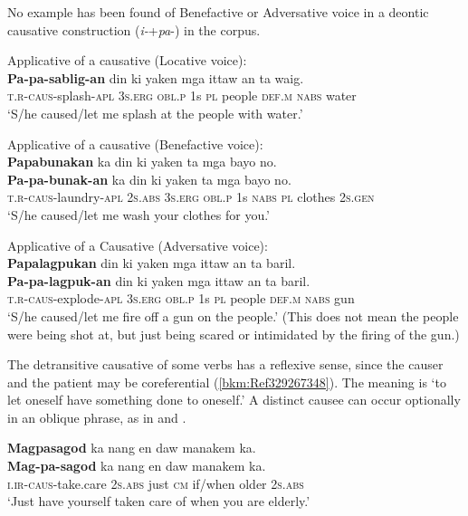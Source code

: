 No example has been found of Benefactive or Adversative voice in a deontic causative construction (\textit{i-}+\textit{pa}{}-) in the corpus.

\ea
Applicative of a causative (Locative voice): \\\smallskip
\gll \textbf{Pa-pa-sablig-an}  din  ki  yaken  mga  ittaw  an  ta  waig. \\
\textsc{t.r}-\textsc{caus}-splash-\textsc{apl}  3\textsc{s.erg}  \textsc{obl.p}  1s  \textsc{pl}  people  \textsc{def.m}  \textsc{nabs}  water \\
\glt ‘S/he caused/let me splash at the people with water.’
\z

\ea
Applicative of a causative (Benefactive voice): \\
\textbf{Papabunakan}  ka  din  ki  yaken  ta  mga  bayo  no. \\\smallskip
\gll \textbf{Pa-pa-bunak-an}  ka  din  ki  yaken  ta  mga  bayo  no. \\
\textsc{t.r}-\textsc{caus}-laundry-\textsc{apl}  2\textsc{s.abs}  3\textsc{s.erg}  \textsc{obl.p}  1s  \textsc{nabs}  \textsc{pl}  clothes  2\textsc{s.gen} \\
\glt ‘S/he caused/let me wash your clothes for you.’
\z

\ea
Applicative of a Causative (Adversative voice): \\
\textbf{Papalagpukan}  din  ki  yaken  mga  ittaw  an  ta  baril. \\\smallskip
\gll \textbf{Pa-pa-lagpuk-an}  din  ki  yaken  mga  ittaw  an  ta  baril. \\
\textsc{t.r}-\textsc{caus}-explode-\textsc{apl}  3\textsc{s.erg}  \textsc{obl.p}  1s  \textsc{pl}  people  \textsc{def.m}  \textsc{nabs}  gun \\
\glt ‘S/he caused/let me fire off a gun on the people.’ (This does not mean the people were being shot at, but just being scared or intimidated by the firing of the gun.)
\z

The detransitive causative of some verbs has a reflexive sense, since the causer and the patient may be coreferential (\ref{bkm:Ref329267348}). The meaning is ‘to let oneself have something done to oneself.’ A distinct causee can occur optionally in an oblique phrase, as in  and .

\ea
\label{bkm:Ref329267348}
\textbf{Magpasagod}  ka  nang  en  daw  manakem  ka. \\\smallskip
\gll \textbf{Mag-pa-sagod}  ka  nang  en  daw  manakem  ka. \\
\textsc{i.ir}-\textsc{caus}-take.care  2\textsc{s.abs}  just  \textsc{cm}  if/when  older  2\textsc{s.abs} \\
\glt ‘Just have yourself taken care of when you are elderly.’
\z

